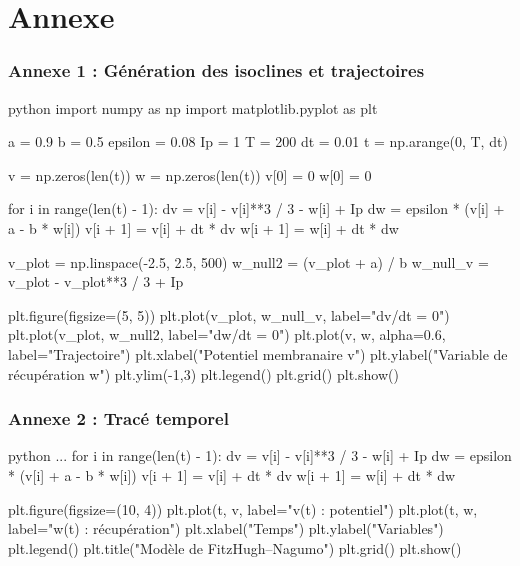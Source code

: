 \section{Annexe}

\begin{frame}[fragile]
\frametitle{Annexe 1 : Génération des isoclines et trajectoires}
\begin{mintedbox}[fontsize=\tiny]{python}
import numpy as np
import matplotlib.pyplot as plt

a = 0.9
b = 0.5
epsilon = 0.08
Ip = 1
T = 200
dt = 0.01
t = np.arange(0, T, dt)

v = np.zeros(len(t))
w = np.zeros(len(t))
v[0] = 0
w[0] = 0

for i in range(len(t) - 1):
    dv = v[i] - v[i]**3 / 3 - w[i] + Ip
    dw = epsilon * (v[i] + a - b * w[i])
    v[i + 1] = v[i] + dt * dv
    w[i + 1] = w[i] + dt * dw

v_plot = np.linspace(-2.5, 2.5, 500)
w_null2 = (v_plot + a) / b
w_null_v = v_plot - v_plot**3 / 3 + Ip

plt.figure(figsize=(5, 5))
plt.plot(v_plot, w_null_v, label="dv/dt = 0")
plt.plot(v_plot, w_null2, label="dw/dt = 0")
plt.plot(v, w, alpha=0.6, label="Trajectoire")
plt.xlabel("Potentiel membranaire v")
plt.ylabel("Variable de récupération w")
plt.ylim(-1,3)
plt.legend()
plt.grid()
plt.show()
\end{mintedbox}
\end{frame}

\begin{frame}[fragile]
\frametitle{Annexe 2 : Tracé temporel}
\begin{mintedbox}[fontsize=\tiny]{python}
...
for i in range(len(t) - 1):
    dv = v[i] - v[i]**3 / 3 - w[i] + Ip
    dw = epsilon * (v[i] + a - b * w[i])
    v[i + 1] = v[i] + dt * dv
    w[i + 1] = w[i] + dt * dw
    
plt.figure(figsize=(10, 4))
plt.plot(t, v, label="v(t) : potentiel")
plt.plot(t, w, label="w(t) : récupération")
plt.xlabel("Temps")
plt.ylabel("Variables")
plt.legend()
plt.title("Modèle de FitzHugh–Nagumo")
plt.grid()
plt.show()

\end{mintedbox}
\end{frame}

